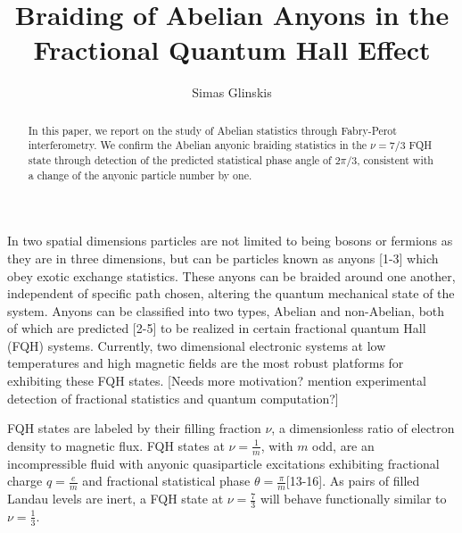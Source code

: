 \documentclass[]{article}
\title{Braiding of Abelian Anyons in the Fractional Quantum Hall Effect}
\author{Simas Glinskis}
\begin{document}
	
	\maketitle

\begin{abstract}
In this paper, we report on the study of Abelian statistics through Fabry-Perot interferometry. We confirm the Abelian anyonic braiding statistics in the $\nu = 7/3$ FQH state through detection of the predicted statistical phase angle of $2\pi/3$, consistent with a change of the anyonic particle number by one. 
\end{abstract}



In two spatial dimensions particles are not limited to being bosons or fermions as they are in three dimensions, but can be particles known as anyons [1-3] which obey exotic exchange statistics. These anyons can be braided around one another, independent of specific path chosen, altering the quantum mechanical state of the system. Anyons can be classified into two types, Abelian and non-Abelian, both of which are predicted [2-5] to be realized in certain fractional quantum Hall (FQH) systems. Currently, two dimensional electronic systems at low temperatures and high magnetic fields are the most robust platforms for exhibiting these FQH states. [Needs more motivation? mention experimental detection of fractional statistics and quantum computation?]


	FQH states are labeled by their filling fraction $\nu$, a dimensionless ratio of electron density to magnetic flux. FQH states at $\nu = \frac{1}{m}$, with $m$ odd, are an incompressible fluid with anyonic quasiparticle excitations exhibiting fractional charge $q = \frac{e}{m}$ and fractional statistical phase $\theta = \frac{\pi}{m}$[13-16]. As pairs of filled Landau levels are inert, a FQH state at $\nu = \frac{7}{3}$ will behave functionally similar to $\nu=\frac{1}{3}$.
	
\end{document}
